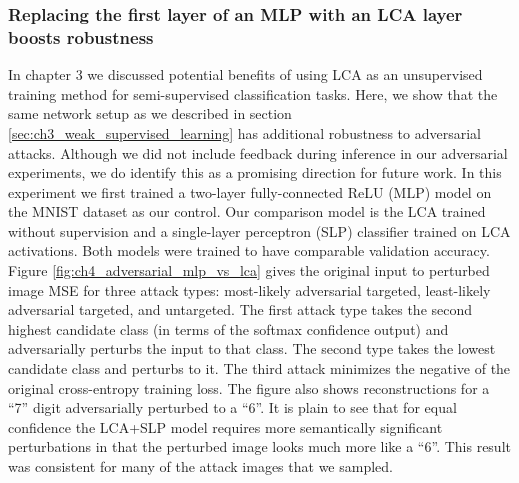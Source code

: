 \subsubsection{Replacing the first layer of an MLP with an LCA layer boosts robustness}
In chapter 3 we discussed potential benefits of using LCA as an unsupervised training method for semi-supervised classification tasks. %
Here, we show that the same network setup as we described in section \ref{sec:ch3_weak_supervised_learning} has additional robustness to adversarial attacks.
Although we did not include feedback during inference in our adversarial experiments, we do identify this as a promising direction for future work.
In this experiment we first trained a two-layer fully-connected ReLU (MLP) model on the MNIST dataset as our control.
Our comparison model is the LCA trained without supervision and a single-layer perceptron (SLP) classifier trained on LCA activations.
Both models were trained to have comparable validation accuracy.
Figure \ref{fig:ch4_adversarial_mlp_vs_lca} gives the original input to perturbed image MSE for three attack types: most-likely adversarial targeted, least-likely adversarial targeted, and untargeted.
The first attack type takes the second highest candidate class (in terms of the softmax confidence output) and adversarially perturbs the input to that class.
The second type takes the lowest candidate class and perturbs to it.
The third attack minimizes the negative of the original cross-entropy training loss.
The figure also shows reconstructions for a ``7'' digit adversarially perturbed to a ``6''.
It is plain to see that for equal confidence the LCA+SLP model requires more semantically significant perturbations in that the perturbed image looks much more like a ``6''.
This result was consistent for many of the attack images that we sampled.

